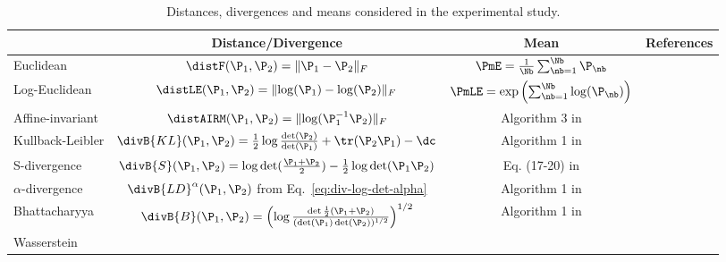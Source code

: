 \begin{table}[h]
  \centering
  \begin{tabular}{ l | c | c | c |}
    \cline{2-4}
    & Distance/Divergence & Mean & References \rule[-5pt]{0pt}{18pt} \\ \hline
    \multicolumn{1}{|l|}{Euclidean} & $\distF(\P_1, \P_2) = \lVert \P_1-\P_2 \rVert _F$ & $\PmE = \frac{1}{\Nb}\sum_{\nb=1}^{\Nb} \P_\nb$ & \rule[-5pt]{0pt}{18pt} \\   
		 \multicolumn{1}{|l|}{Log-Euclidean} & $\distLE(\P_1, \P_2) = \lVert \log(\P_1)-\log(\P_2) \rVert_F$ & $\PmLE = \exp \left(\sum_{\nb=1}^{\Nb} \log(\P_\nb) \right) $ & \cite{arsigny_geometric_2007} 
		\rule[-5pt]{0pt}{18pt} \\    
     \multicolumn{1}{|l|}{Affine-invariant} & $\distAIRM(\P_1, \P_2) = \lVert \log(\P_1^{-1}\P_2) \rVert_F$ & Algorithm 3 in \cite{fletcher_principal_2004}  & \cite{moakher_differential_2005,letcher_principal_2004} 
		\rule[-5pt]{0pt}{18pt} \\	
	\multicolumn{1}{|l|}{Kullback-Leibler} & $\divB{KL}(\P_1, \P_2) = \frac{1}{2} \log \frac{\det(\P_2)}{\det(\P_1)} + \tr(\P_2 \P_1) - \dc$ & Algorithm 1 in \cite{chebbi_means_2012} & \cite{chebbi_means_2012, kang_composite_2009} \rule[-5pt]{0pt}{18pt} \\
	\multicolumn{1}{|l|}{S-divergence} & $\divB{S}(\P_1,\P_2) = \log \det(\frac{\P_1+\P_2}{2}) - \frac{1}{2}\log \det(\P_1 \P_2)$ &  Eq. (17-20) in \cite{cherian_efficient_2011} & \cite{sra_positive_2016, cherian_efficient_2011} \rule[-5pt]{0pt}{18pt} \\
    \multicolumn{1}{|l|}{$\alpha$-divergence} & $\divB{LD}^\alpha (\P_1, \P_2)$ from Eq.~\eqref{eq:div-log-det-alpha} & Algorithm 1 in \cite{chebbi_means_2012} & \cite{chebbi_means_2012} \rule[-5pt]{0pt}{18pt} \\ 
    \multicolumn{1}{|l|}{Bhattacharyya} & $\divB{B}(\P_1, \P_2)=\left( \log \frac{ \det \frac{1}{2} (\P_1+\P_2)}{(\det (\P_1)\det(\P_2))^{1/2}} \right)^{1/2}$ & Algorithm 1 in \cite{chebbi_means_2012} & \cite{nielsen_matrix_2012,chebbi_means_2012} \rule[-5pt]{0pt}{18pt} \\ 
    \multicolumn{1}{|l|}{Wasserstein} &  &  &  \rule[-5pt]{0pt}{18pt} \\ \hline
  \end{tabular}
  \caption{Distances, divergences and means considered in the experimental study.}
  \label{tab:dist}
\end{table}

